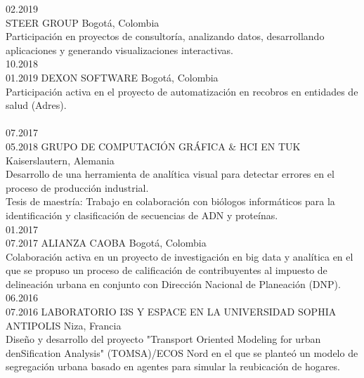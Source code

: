 \documentclass[espanol]{cv-style}          %
\begin{document}
\begin{entrylist}
\entry
  {02.2019\\}
  {STEER GROUP}
  {Bogotá, Colombia}
  {\\
  Participación en proyectos de consultoría, analizando datos, desarrollando aplicaciones y generando visualizaciones interactivas.\\
  {\vspace{-0.2cm}}}
\entry
  {10.2018\\01.2019}
  {DEXON SOFTWARE}
  {Bogotá, Colombia}
  {\\
  Participación activa en el proyecto de automatización en recobros en entidades de salud (Adres). \\
    \\
  {\vspace{-0.2cm}}}
\entry
  {07.2017\\05.2018}
  {GRUPO DE COMPUTACIÓN GRÁFICA \& HCI EN TUK}
  {Kaiserslautern, Alemania}
  {\\
  Desarrollo de una herramienta de analítica visual para detectar errores en el proceso de producción industrial.\\
  Tesis de maestría: Trabajo en colaboración con biólogos informáticos para la identificación y clasificación de secuencias de ADN y proteínas.\\
  {\vspace{-0.2cm}}}
\entry
  {01.2017\\07.2017}
  {ALIANZA CAOBA}
  {Bogotá, Colombia}
  {\\
  Colaboración activa en un proyecto de investigación en big data y analítica en el que se propuso un proceso de calificación de contribuyentes al impuesto de delineación urbana en conjunto con Dirección Nacional de Planeación (DNP).\\
   {\vspace{-0.2cm}}}
\entry
  {06.2016\\07.2016}
  {LABORATORIO I3S Y ESPACE EN LA UNIVERSIDAD SOPHIA ANTIPOLIS}
  {Niza, Francia}
  {\\
  Diseño y desarrollo del proyecto "Transport Oriented Modeling for urban denSification Analysis" (TOMSA)/ECOS Nord en el que se planteó un modelo de segregación urbana basado en agentes para simular la reubicación de hogares.\\
  {\vspace{-0.5cm}}}

\end{entrylist}
\end{document}
